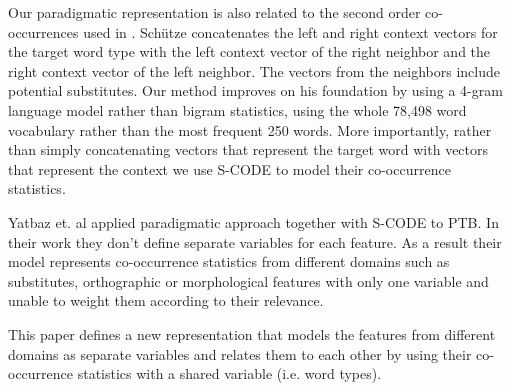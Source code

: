 Our paradigmatic representation is also related to the second order
co-occurrences used in \cite{Schutze:1995:DPT:976973.976994}.
Sch{\"u}tze concatenates the left and right context vectors for the
target word type with the left context vector of the right neighbor
and the right context vector of the left neighbor.  The vectors from
the neighbors include potential substitutes.  Our method improves on
his foundation by using a 4-gram language model rather than bigram
statistics, using the whole 78,498 word vocabulary rather than the
most frequent 250 words.  More importantly, rather than simply
concatenating vectors that represent the target word with vectors that
represent the context we use S-CODE to model their co-occurrence
statistics.  

Yatbaz et. al  applied
paradigmatic approach together with S-CODE to PTB.  In their work they
don't define separate variables for each feature.  As a result their
model represents co-occurrence statistics from different domains such
as substitutes, orthographic or morphological features with only one
variable and unable to weight them according to their relevance.

This paper defines a new representation that models the features from
different domains as separate variables and relates them to each other
by using their co-occurrence statistics with a shared variable
(i.e. word types).  


